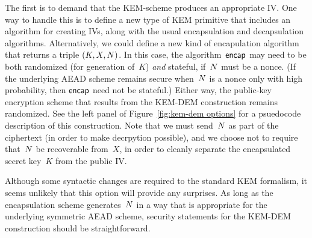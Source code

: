 The first is to demand that the KEM-scheme produces an appropriate IV.  One way to handle this is to define a new type of KEM primitive that includes an algorithm for creating IVs, along with the usual encapsulation and decapsulation algorithms.  Alternatively, we could define a new kind of encapulation algorithm that returns a triple $(K,X,N)$.  In this case, the algorithm~$\mathsf{encap}$ may need to be both randomized (for generation of~$K$) \emph{and} stateful, if~$N$ must be a nonce.  (If the underlying AEAD scheme remains secure when~$N$ is a nonce only with high probability, then $\mathsf{encap}$ need not be stateful.)  Either way, the public-key encryption scheme that results from the KEM-DEM construction remains randomized.  See the left panel of Figure~\ref{fig:kem-dem options} for a psuedocode description of this construction.  Note that we must send~$N$ as part of the ciphertext (in order to make decrpytion possible), and we choose not to require that~$N$ be recoverable from~$X$, in order to cleanly separate the encapsulated secret key~$K$ from the public IV.

Although some syntactic changes are required to the standard KEM formalism, it seems unlikely that this option will provide any surprises.  As long as the encapsulation scheme generates~$N$ in a way that is appropriate for the underlying symmetric AEAD scheme, security statements for the KEM-DEM construction should be straightforward.

